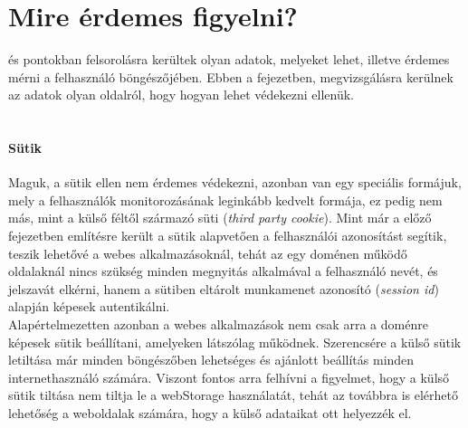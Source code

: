 \section{Mire érdemes figyelni?} %
\label{sec:mire_érdemes_figyelni__}

 és  pontokban felsorolásra kerültek olyan adatok, melyeket lehet, illetve érdemes mérni a felhasználó böngészőjében. Ebben a fejezetben, megvizsgálásra kerülnek az adatok olyan oldalról, hogy hogyan lehet védekezni ellenük.\hfill\\
\\
\paragraph{Sütik} %
\label{par:sutik_security}
Maguk, a sütik ellen nem érdemes védekezni, azonban van egy speciális formájuk, mely a felhasználók monitorozásának leginkább kedvelt formája, ez pedig nem más, mint a külső féltől származó süti (\textit{third party cookie}). Mint már a előző fejezetben említésre került a sütik alapvetően a felhasználói azonosítást segítik, teszik lehetővé a webes alkalmazásoknál, tehát az egy doménen működő oldalaknál nincs szükség minden megnyitás alkalmával a felhasználó nevét, és jelszavát elkérni, hanem a sütiben eltárolt munkamenet azonosító (\textit{session id}) alapján képesek autentikálni. \hfill\\
Alapértelmezetten azonban a webes alkalmazások nem csak arra a doménre képesek sütik beállítani, amelyeken látszólag működnek. Szerencsére a külső sütik letiltása már minden böngészőben lehetséges és ajánlott beállítás minden internethasználó számára. Viszont fontos arra felhívni a figyelmet, hogy a külső sütik tiltása nem tiltja le a webStorage használatát, tehát az továbbra is elérhető lehetőség a weboldalak számára, hogy a külső adataikat ott helyezzék el.
\\
